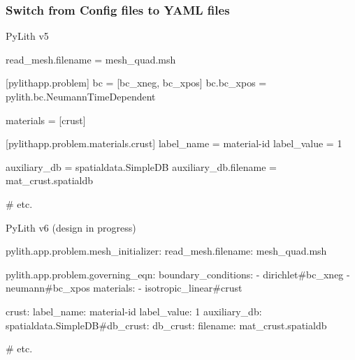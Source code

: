 \documentclass[aspectratio=169]{beamer}
\begin{document}
\begin{frame}[t,fragile]
  \frametitle{Switch from Config files to YAML files}

  \begin{minipage}[t]{0.45\textwidth}
    {\scriptsize PyLith v5}
      \begin{cfgcode}
        read_mesh.filename = mesh_quad.msh

        [pylithapp.problem]
        bc = [bc_xneg, bc_xpos]
        bc.bc_xpos = pylith.bc.NeumannTimeDependent

        materials = [crust]

        [pylithapp.problem.materials.crust]
        label_name = material-id
        label_value = 1

        auxiliary_db = spatialdata.SimpleDB
        auxiliary_db.filename = mat_crust.spatialdb

        # etc.
      \end{cfgcode}
  \end{minipage}
  \hfill
  \begin{minipage}[t]{0.45\textwidth}
    {\scriptsize PyLith v6 (design in progress)}
      \begin{yamlcode}
        pylith.app.problem.mesh_initializer:
          read_mesh.filename: mesh_quad.msh

        pylith.app.problem.governing_eqn:
          boundary_conditions:
            - dirichlet#bc_xneg
            - neumann#bc_xpos
          materials:
            - isotropic_linear#crust

        crust:
          label_name: material-id
          label_value: 1
          auxiliary_db: spatialdata.SimpleDB#db_crust:
        db_crust:
          filename: mat_crust.spatialdb

        # etc.
      \end{yamlcode}
  \end{minipage}
  
\end{frame}
\end{document}
